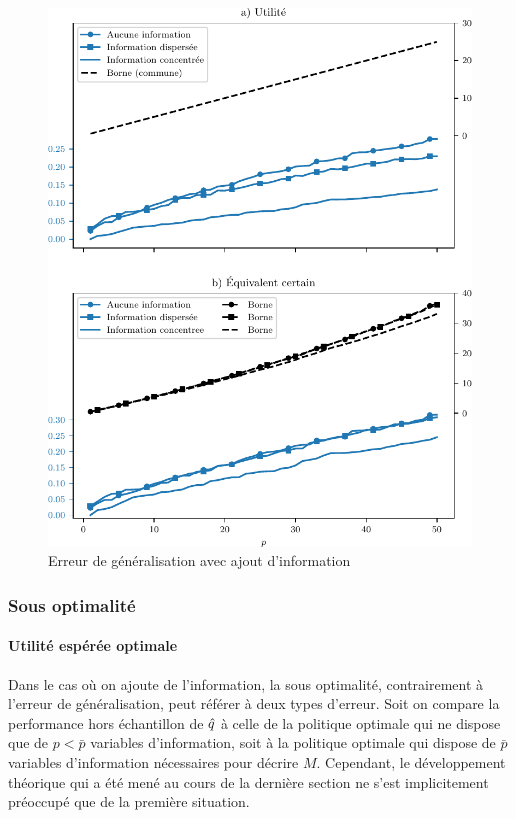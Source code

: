 \begin{figure}[h!]
  \centering
  \includegraphics[width=1\textwidth]{../../experiments/fig/pconst_infogen.pdf}
  \caption{Erreur de généralisation avec ajout d'information}
  \label{fig_pconst_infogen}
\end{figure}

\clearpage

\subsubsection{Sous optimalité}

\paragraph{Utilité espérée optimale}

Dans le cas où on ajoute de l'information, la sous optimalité, contrairement à l'erreur de
généralisation, peut référer à deux types d'erreur. Soit on compare la performance hors
échantillon de $\hat q$ à celle de la politique optimale qui ne dispose que de $p < \bar p$
variables d'information, soit à la politique optimale qui dispose de $\bar p$ variables
d'information nécessaires pour décrire $M$. Cependant, le développement théorique qui a
été mené au cours de la dernière section ne s'est implicitement préoccupé que de la
première situation.

